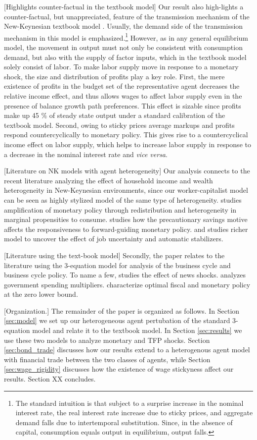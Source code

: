 [Highlights counter-factual in the textbook model] Our result also high-lights a counter-factual, but unappreciated, feature of the transmission mechanism of the New-Keynesian textbook model \citep{Gali2009}. Usually, the demand side of the transmission mechanism in this model is emphasized.\footnote{The standard intuition is that subject to a surprise increase in the nominal interest rate, the real interest rate increase due to sticky prices, and aggregate demand falls due to intertemporal substitution. Since, in the absence of capital, consumption equals output in equilibrium, output falls.} However, as in any general equilibrium model, the movement in output must not only be consistent with consumption demand, but also with the supply of factor inputs, which in the textbook model solely consist of labor. To make labor supply move in response to a monetary shock, the size and distribution of profits play a key role. First, the mere existence of profits in the budget set of the representative agent decreases the relative income effect, and thus allows wages to affect labor supply even in the presence of balance growth path preferences. This effect is sizable since profits make up 45 \% of steady state output under a standard calibration of the textbook model. Second, owing to sticky prices average markups and profits respond countercyclically to monetary policy. This gives rise to a countercyclical income effect on labor supply, which helps to increase labor supply in response to a decrease in the nominal interest rate and \emph{vice versa}.

[Literature on NK models with agent heterogeneity] Our analysis connects to the recent literature analyzing the effect of household income and wealth heterogeneity in New-Keynesian environments, since our worker-capitalist model can be seen as highly stylized model of the same type of heterogeneity. \citet{Auclert2015} studies amplification of monetary policy through redistribution and heterogeneity in marginal propensities to consume. \citet{McKay2015} studies how the precautionary savings motive affects the responsiveness to forward-guiding monetary policy. \citet{McKay2013} and \citet{Ravn2012a} studies richer model to uncover the effect of job uncertainty and automatic stabilizers. 

[Literature using the text-book model]
Secondly, the paper relates to the literature using the 3-equation model for analysis of the business cycle and business cycle policy. To name a few, \citet{Lorenzoni2009} studies the effect of news shocks. \citet{Christiano2011} analyzes government spending multipliers. \citet{Werning2012} characterize optimal fiscal and monetary policy at the zero lower bound. 

[Organization.] The remainder of the paper is organized as follows. In Section \ref{sec:model} we set up our heterogeneous agent pertubation of the standard 3-equation model and relate it to the textbook model. In Section \ref{sec:results} we use these two models to analyze monetary and TFP shocks. Section \ref{sec:bond_trade} discusses how our results extend to a heterogenous agent model with financial trade between the two classes of agents, while Section \ref{sec:wage_rigidity} discusses how the existence of wage stickyness affect our results. Section XX concludes. 